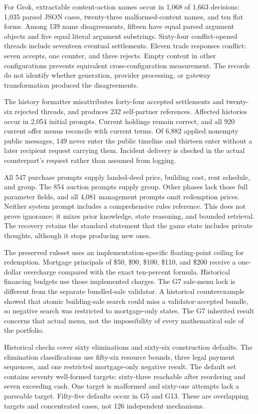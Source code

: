 For Grok, extractable content-action names occur in 1,068 of 1,663 decisions: 1,035 parsed JSON cases, twenty-three malformed-content names, and ten flat forms. Among 139 name disagreements, fifteen have equal parsed argument objects and five equal literal argument substrings. Sixty-four conflict-opened threads include seventeen eventual settlements. Eleven trade responses conflict: seven accepts, one counter, and three rejects. Empty content in other configurations prevents equivalent cross-configuration measurement. The records do not identify whether generation, provider processing, or gateway transformation produced the disagreements.

The history formatter misattributes forty-four accepted settlements and twenty-six rejected threads, and produces 232 self-partner references. Affected histories occur in 2,054 initial prompts. Current holdings remain correct, and all 920 current offer menus reconcile with current terms. Of 6,882 applied nonempty public messages, 149 never enter the public timeline and thirteen enter without a later recipient request carrying them. Incident delivery is checked in the actual counterpart's request rather than assumed from logging.

All 547 purchase prompts supply landed-deed price, building cost, rent schedule, and group. The 854 auction prompts supply group. Other phases lack those full parameter fields, and all 4,081 management prompts omit redemption prices. Neither system prompt includes a comprehensive rules reference. This does not prove ignorance; it mixes prior knowledge, state reasoning, and bounded retrieval. The recovery retains the standard statement that the game state includes private thoughts, although it stops producing new ones.

The preserved ruleset uses an implementation-specific floating-point ceiling for redemption. Mortgage principals of \$50, \$90, \$100, \$110, and \$200 receive a one-dollar overcharge compared with the exact ten-percent formula. Historical financing budgets use those implemented charges. The G7 sale-menu lock is different from the separate bundled-sale validator. A historical counterexample showed that atomic building-sale search could miss a validator-accepted bundle, so negative search was restricted to mortgage-only states. The G7 inherited result concerns that actual menu, not the impossibility of every mathematical sale of the portfolio.

Historical checks cover sixty eliminations and sixty-six construction defaults. The elimination classifications use fifty-six resource bounds, three legal payment sequences, and one restricted mortgage-only negative result. The default set contains seventy well-formed targets: sixty-three reachable after reordering and seven exceeding cash. One target is malformed and sixty-one attempts lack a parseable target. Fifty-five defaults occur in G5 and G13. These are overlapping targets and concentrated cases, not 126 independent mechanisms.

